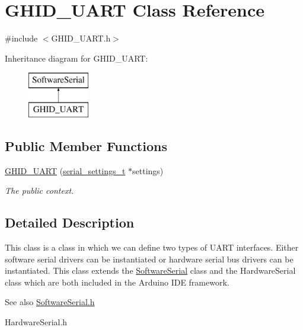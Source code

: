 \hypertarget{class_g_h_i_d___u_a_r_t}{\section{\-G\-H\-I\-D\-\_\-\-U\-A\-R\-T \-Class \-Reference}
\label{class_g_h_i_d___u_a_r_t}
}


{\ttfamily \#include $<$\-G\-H\-I\-D\-\_\-\-U\-A\-R\-T.\-h$>$}

\-Inheritance diagram for \-G\-H\-I\-D\-\_\-\-U\-A\-R\-T\-:\begin{figure}[H]
\begin{center}
\leavevmode
\includegraphics[height=2.000000cm]{class_g_h_i_d___u_a_r_t}
\end{center}
\end{figure}
\subsection*{\-Public \-Member \-Functions}
\begin{DoxyCompactItemize}
\item 
\hyperlink{class_g_h_i_d___u_a_r_t_a6771433287d911797183f98453c7043d}{\-G\-H\-I\-D\-\_\-\-U\-A\-R\-T} (\hyperlink{structserial__settings__t}{serial\-\_\-settings\-\_\-t} $\ast$settings)
\begin{DoxyCompactList}\small\item\em \-The public context. \end{DoxyCompactList}\end{DoxyCompactItemize}


\subsection{\-Detailed \-Description}
\-This class is a class in which we can define two types of \-U\-A\-R\-T interfaces. \-Either software serial drivers can be instantiated or hardware serial bus drivers can be instantiated. \-This class extends the \hyperlink{class_software_serial}{\-Software\-Serial} class and the \-Hardware\-Serial class which are both included in the \-Arduino \-I\-D\-E framework.

\begin{DoxySeeAlso}{\-See also}
\hyperlink{_software_serial_8h}{\-Software\-Serial.\-h} 

\-Hardware\-Serial.\-h 
\end{DoxySeeAlso}


